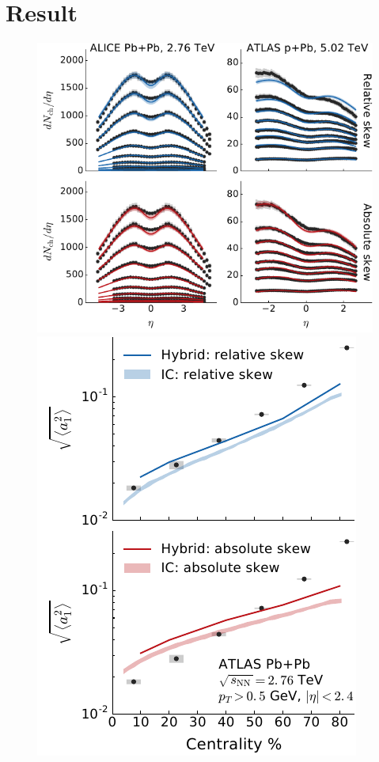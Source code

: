 \documentclass[3p,times,twocolumn]{elsarticle}
\begin{document}
\section{Result}
\begin{figure}
\includegraphics{chg_particle_rapidity.pdf}
\hfill
\includegraphics{fw_correlation_a1.pdf}
\end{figure}
\end{document}
